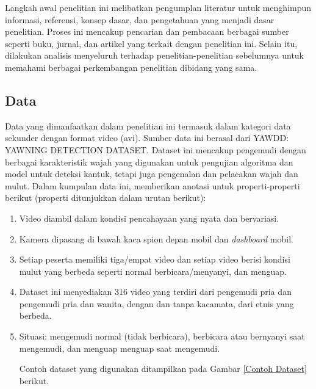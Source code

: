     Langkah awal penelitian ini melibatkan pengumplan literatur untuk menghimpun informasi, referensi, konsep dasar, dan pengetahuan yang menjadi dasar penelitian. Proses ini mencakup pencarian dan pembacaan berbagai sumber seperti buku, jurnal, dan artikel yang terkait dengan penelitian ini. Selain itu, dilakukan analisis menyeluruh terhadap penelitian-penelitian sebelumnya untuk memahami berbagai perkembangan penelitian dibidang yang sama.

    
\subsection{Data}

    Data yang dimanfaatkan dalam penelitian ini termasuk dalam kategori data sekunder dengan format video (avi). Sumber data ini berasal dari YAWDD: YAWNING DETECTION DATASET. Dataset ini mencakup pengemudi dengan berbagai karakteristik wajah yang digunakan untuk pengujian algoritma dan model untuk deteksi kantuk, tetapi juga pengenalan dan pelacakan wajah dan 
    mulut. Dalam kumpulan data ini, memberikan anotasi untuk properti-properti berikut (properti ditunjukkan dalam urutan berikut):


    \begin{enumerate}

        \item Video diambil dalam kondisi pencahayaan yang nyata dan bervariasi.
        \item Kamera dipasang di bawah kaca spion depan mobil dan \textit{dashboard} mobil. 
        \item  Setiap peserta memiliki tiga/empat video dan setiap video berisi kondisi mulut yang berbeda seperti normal berbicara/menyanyi, dan menguap. 
        \item Dataset ini menyediakan 316 video yang terdiri dari pengemudi pria dan 
        pengemudi pria dan wanita, dengan dan tanpa kacamata, dari etnis yang berbeda.
        \item Situasi: mengemudi normal (tidak berbicara), berbicara atau bernyanyi saat mengemudi, dan menguap menguap saat mengemudi.



    Contoh dataset yang digunakan ditampilkan pada Gambar \ref{Contoh Dataset} berikut.


        
    
    \end{enumerate}
    
